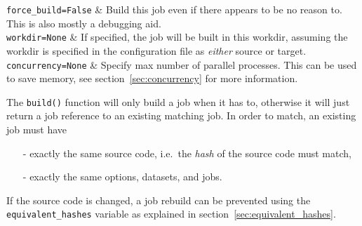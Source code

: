 \RPtwo \texttt{force\_build=False} & Build this job even if there appears
    to be no reason to. This is also mostly a debugging aid.\\

\RPtwo \texttt{workdir=None} & If specified, the job will be built in
    this workdir, assuming the workdir is specified in the
    configuration file as \textsl{either} source or target.\\

\RPtwo \texttt{concurrency=None} & Specify max number of parallel processes.
       This can be used to save memory, see section~\ref{sec:concurrency}
       for more information.\\
\stoptabletwo

The \texttt{build()} function will only build a job when it has to,
otherwise it will just return a job reference to an existing matching
job.  In order to match, an existing job must have
\begin{itemize}
\item[-] exactly the same source code, i.e.\ the \textsl{hash} of the source code must match,
\item[-] exactly the same options, datasets, and jobs.
\end{itemize}
If the source code is changed, a job rebuild can be prevented using
the \texttt{equivalent\_hashes} variable as explained in
section~\ref{sec:equivalent_hashes}.



